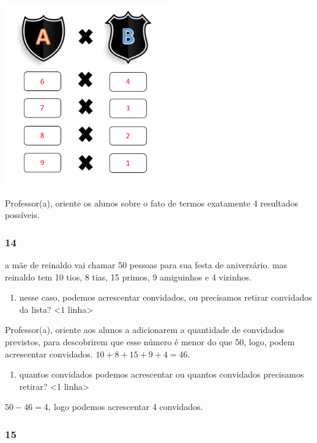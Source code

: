 \includegraphics[width=2.78474in,height=3.08282in]{media/image19.png}

Professor(a), oriente os alunos sobre o fato de termos exatamente 4
resultados possíveis.

\subsubsection{14}\label{section-21}

a mãe de reinaldo vai chamar 50 pessoas para sua festa de aniversário.
mas reinaldo tem 10 tios, 8 tias, 15 primos, 9 amiguinhos e 4 vizinhos.

\begin{enumerate}
\def\labelenumi{\Alph{enumi})}
\item
  nesse caso, podemos acrescentar convidados, ou precisamos retirar
  convidados da lista? \textless{}1 linha\textgreater{}
\end{enumerate}

Professor(a), oriente aos alunos a adicionarem a quantidade de
convidados previstos, para descobrirem que esse número é menor do que
50, logo, podem acrescentar convidados. \(10 + 8 + 15 + 9 + 4 = 46.\)

\begin{enumerate}
\def\labelenumi{\Alph{enumi})}
\item
  quantos convidados podemos acrescentar ou quantos convidados
  precisamos retirar? \textless{}1 linha\textgreater{}
\end{enumerate}

\(50 - 46 = 4,\ \)logo podemos acrescentar 4 convidados.

\subsubsection{15}\label{section-22}

